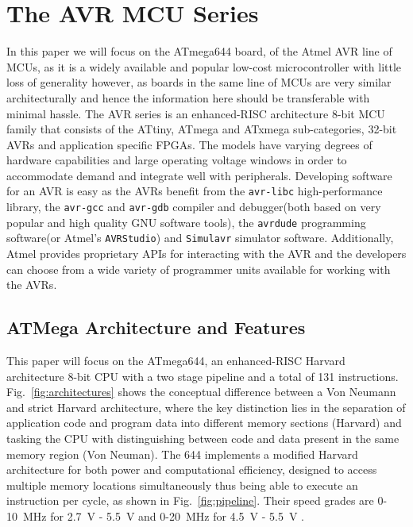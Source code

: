 \section{The AVR MCU Series}
\label{sec:atmega_overview}

In this paper we will focus on the ATmega644 board, of the Atmel AVR line of MCUs, as it is a widely available and popular low-cost microcontroller \citep{glitches_paper} with little loss of generality however, as boards in the same line of MCUs are very similar architecturally and hence the information here should be transferable with minimal hassle. The AVR series is an enhanced-RISC architecture 8-bit MCU family that consists of the ATtiny, ATmega and ATxmega sub-categories, 32-bit AVRs and application specific FPGAs\cite{book:practical_avr}. The models have varying degrees of hardware capabilities and large operating voltage windows in order to accommodate demand and integrate well with peripherals. Developing software for an AVR is easy as the AVRs benefit from the \texttt{avr-libc} high-performance library, the \texttt{avr-gcc} and \texttt{avr-gdb} compiler and debugger(both based on very popular and high quality GNU software tools), the \texttt{avrdude} programming software(or Atmel's \texttt{AVRStudio}) and \texttt{Simulavr} simulator software. Additionally, Atmel provides proprietary APIs for interacting with the AVR and the developers can choose from a wide variety of programmer units available for working with the AVRs\cite{book:practical_avr}.
\subsection{ATMega Architecture and Features} 

This paper will focus on the ATmega644, an enhanced-RISC Harvard architecture 8-bit CPU with a two stage pipeline and a total of 131 instructions. Fig.~\ref{fig:architectures} shows the conceptual difference between a Von Neumann and strict Harvard architecture, where the key distinction lies in the separation of application code and program data into different memory sections (Harvard) and tasking the CPU with distinguishing between code and data present in the same memory region (Von Neuman). The 644 implements a modified Harvard architecture for both power and computational efficiency, designed to access multiple memory locations simultaneously thus being able to execute an instruction per cycle, as shown in Fig.~\ref{fig:pipeline}. Their speed grades are 0-10~MHz for 2.7~V - 5.5~V and 0-20~MHz for 4.5~V - 5.5~V \citep{atmega_manual}.

